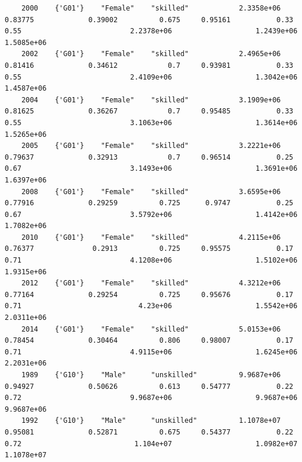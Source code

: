 \documentclass[
]{book}
\begin{document}
\begin{verbatim}
    2000    {'G01'}    "Female"    "skilled"            2.3358e+06            0.83775             0.39002          0.675     0.95161           0.33               0.55                          2.2378e+06                    1.2439e+06             1.5085e+06        
    2002    {'G01'}    "Female"    "skilled"            2.4965e+06            0.81416             0.34612            0.7     0.93981           0.33               0.55                          2.4109e+06                    1.3042e+06             1.4587e+06        
    2004    {'G01'}    "Female"    "skilled"            3.1909e+06            0.81625             0.36267            0.7     0.95485           0.33               0.55                          3.1063e+06                    1.3614e+06             1.5265e+06        
    2005    {'G01'}    "Female"    "skilled"            3.2221e+06            0.79637             0.32913            0.7     0.96514           0.25               0.67                          3.1493e+06                    1.3691e+06             1.6397e+06        
    2008    {'G01'}    "Female"    "skilled"            3.6595e+06            0.77916             0.29259          0.725      0.9747           0.25               0.67                          3.5792e+06                    1.4142e+06             1.7082e+06        
    2010    {'G01'}    "Female"    "skilled"            4.2115e+06            0.76377              0.2913          0.725     0.95575           0.17               0.71                          4.1208e+06                    1.5102e+06             1.9315e+06        
    2012    {'G01'}    "Female"    "skilled"            4.3212e+06            0.77164             0.29254          0.725     0.95676           0.17               0.71                            4.23e+06                    1.5542e+06             2.0311e+06        
    2014    {'G01'}    "Female"    "skilled"            5.0153e+06            0.78454             0.30464          0.806     0.98007           0.17               0.71                          4.9115e+06                    1.6245e+06             2.2031e+06        
    1989    {'G10'}    "Male"      "unskilled"          9.9687e+06            0.94927             0.50626          0.613     0.54777           0.22               0.72                          9.9687e+06                    9.9687e+06             9.9687e+06        
    1992    {'G10'}    "Male"      "unskilled"          1.1078e+07            0.95081             0.52871          0.675     0.54377           0.22               0.72                           1.104e+07                    1.0982e+07             1.1078e+07        

\end{verbatim}
\end{document}
